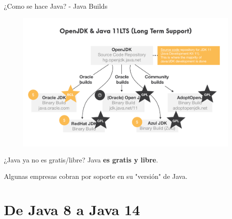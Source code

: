 \documentclass[aspectratio=169]{beamer}
\begin{document}
\begin{frame}[fragile]{¿Como se hace Java? - Java Builds}
	\begin{figure}
		\centering
		\includegraphics[width=0.9\linewidth]{Images/javabuilds}
	\end{figure}
	
\end{frame}

\begin{frame}[fragile]{¿Java ya no es gratis/libre?}
Java \textbf{es gratis y libre}.

Algunas empresas cobran por soporte en su "versión" de Java.
\end{frame}

{
    \section{De Java 8 a Java 14}
}
\end{document}
